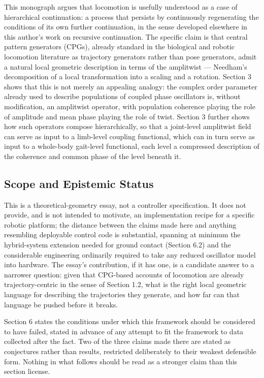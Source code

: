 \documentclass[12pt]{article}
\begin{document}
This monograph argues that locomotion is usefully understood as a case of hierarchical continuation: a process that persists by continuously regenerating the conditions of its own further continuation, in the sense developed elsewhere in this author's work on recursive continuation. The specific claim is that central pattern generators (CPGs), already standard in the biological and robotic locomotion literature as trajectory generators rather than pose generators, admit a natural local geometric description in terms of the amplitwist — Needham's decomposition of a local transformation into a scaling and a rotation. Section 3 shows that this is not merely an appealing analogy: the complex order parameter already used to describe populations of coupled phase oscillators is, without modification, an amplitwist operator, with population coherence playing the role of amplitude and mean phase playing the role of twist. Section 3 further shows how such operators compose hierarchically, so that a joint-level amplitwist field can serve as input to a limb-level coupling functional, which can in turn serve as input to a whole-body gait-level functional, each level a compressed description of the coherence and common phase of the level beneath it.

\subsection{Scope and Epistemic Status}

This is a theoretical-geometry essay, not a controller specification. It does not provide, and is not intended to motivate, an implementation recipe for a specific robotic platform; the distance between the claims made here and anything resembling deployable control code is substantial, spanning at minimum the hybrid-system extension needed for ground contact (Section 6.2) and the considerable engineering ordinarily required to take any reduced oscillator model into hardware. The essay's contribution, if it has one, is a candidate answer to a narrower question: given that CPG-based accounts of locomotion are already trajectory-centric in the sense of Section 1.2, what is the right local geometric language for describing the trajectories they generate, and how far can that language be pushed before it breaks.

Section 6 states the conditions under which this framework should be considered to have failed, stated in advance of any attempt to fit the framework to data collected after the fact. Two of the three claims made there are stated as conjectures rather than results, restricted deliberately to their weakest defensible form. Nothing in what follows should be read as a stronger claim than this section license.
\end{document}

